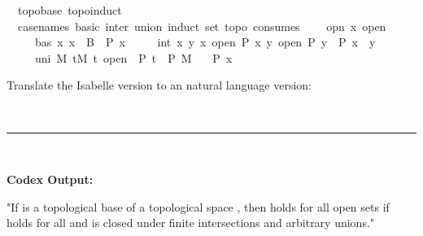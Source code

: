 \documentclass{article}
\begin{document}
\begin{boxB}
\begin{isabelle}
\isamarkupfalse \ {\isacharparenleft}{\kern0pt}\ topobase{\isacharparenright}{\kern0pt}\ topo{\isacharunderscore}{\kern0pt}induct\isanewline
\ \ {\isacharbrackleft}{\kern0pt}case{\isacharunderscore}{\kern0pt}names\ basic\ inter\ union{\isacharcomma}{\kern0pt}\ induct\ set{\isacharcolon}{\kern0pt}\ topo{\isacharcomma}{\kern0pt}\ consumes\ {}{\isacharbrackright}{\kern0pt}{\isacharcolon}{\kern0pt}\isanewline
\ \ \ opn{\isacharcolon}{\kern0pt}\ {\isachardoublequoteopen}x\ open{\isachardoublequoteclose}\isanewline
\ \ \ \ \ bas{\isacharcolon}{\kern0pt}\ {\isachardoublequoteopen}{\isasymAnd}x{\isachardot}{\kern0pt}\ x\ {\isasymin}\ B\ {\isasymLongrightarrow}\ P\ x{\isachardoublequoteclose}\isanewline
\ \ \ \ \ int{\isacharcolon}{\kern0pt}\ {\isachardoublequoteopen}{\isasymAnd}x\ y{\isachardot}{\kern0pt}\ {\isasymlbrakk}x\ open{\isacharsemicolon}{\kern0pt}\ P\ x{\isacharsemicolon}{\kern0pt}\ y\ open{\isacharsemicolon}{\kern0pt}\ P\ y{\isasymrbrakk}\ {\isasymLongrightarrow}\ P\ {\isacharparenleft}{\kern0pt}x\ {\isasyminter}\ y{\isacharparenright}{\kern0pt}{\isachardoublequoteclose}\isanewline
\ \ \ \ \ uni{\isacharcolon}{\kern0pt}\ {\isachardoublequoteopen}{\isasymAnd}M{\isachardot}{\kern0pt}\ {\isacharparenleft}{\kern0pt}{\isasymforall}t{\isasymin}M{\isachardot}{\kern0pt}\ t\ open\ {\isasymand}\ P\ t{\isacharparenright}{\kern0pt}\ {\isasymLongrightarrow}\ P\ {\isacharparenleft}{\kern0pt}{\isasymUnion}M{\isacharparenright}{\kern0pt}{\isachardoublequoteclose}\isanewline
\ \ \ {\isachardoublequoteopen}P\ x{\isachardoublequoteclose}
\end{isabelle}
Translate the Isabelle version to an natural language version:

\
\hrule
\

\textbf{Codex Output:}

"If  is a topological base of a topological space , then  holds for all open sets  if  holds for all  and  is closed under finite intersections and arbitrary unions."
\end{boxB}
\end{document}
